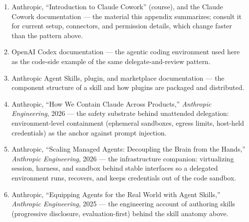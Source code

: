 \begin{small}
\begin{enumerate}
\item Anthropic, ``Introduction to Claude Cowork'' (course), and the Claude Cowork documentation --- the material this appendix summarizes; consult it for current setup, connectors, and permission details, which change faster than the pattern above.
\item OpenAI Codex documentation --- the agentic coding environment used here as the code-side example of the same delegate-and-review pattern.
\item Anthropic Agent Skills, plugin, and marketplace documentation --- the component structure of a skill and how plugins are packaged and distributed.
\item Anthropic, ``How We Contain Claude Across Products,'' \emph{Anthropic Engineering}, 2026 --- the safety substrate behind unattended delegation: environment-level containment (ephemeral sandboxes, egress limits, host-held credentials) as the anchor against prompt injection.
\item Anthropic, ``Scaling Managed Agents: Decoupling the Brain from the Hands,'' \emph{Anthropic Engineering}, 2026 --- the infrastructure companion: virtualizing session, harness, and sandbox behind stable interfaces so a delegated environment runs, recovers, and keeps credentials out of the code sandbox.
\item Anthropic, ``Equipping Agents for the Real World with Agent Skills,'' \emph{Anthropic Engineering}, 2025 --- the engineering account of authoring skills (progressive disclosure, evaluation-first) behind the skill anatomy above.
\end{enumerate}
\end{small}

